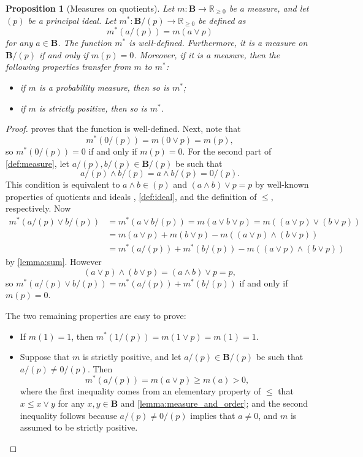 \documentclass{article}
\newtheorem{proposition}{Proposition}
\theoremstyle{definition}
\theoremstyle{remark}
\begin{document}
\begin{proposition}[Measures on quotients] \label{def:measures_on_quotients}
  Let $m\colon \mathbf{B} \to \mathbb{R}_{\ge 0}$ be a measure, and let $(p)$ be
  a principal ideal. Let $m^*\colon \mathbf{B}/(p) \to \mathbb{R}_{\ge 0}$ be
  defined as
  \[
    m^*(a/(p)) = m(a \lor p)
  \]
  for any $a \in \mathbf{B}$. The function $m^*$ is well-defined. Furthermore,
  it is a measure on $\mathbf{B}/(p)$ if and only if $m(p) = 0$. Moreover, if it
  is a measure, then the following properties transfer from $m$ to $m^*$:
  \begin{itemize}
  \item if $m$ is a \emph{probability measure}, then so is $m^*$;
  \item if $m$ is \emph{strictly positive}, then so is $m^*$.
  \end{itemize}
\end{proposition}
\begin{proof}
   proves that the function is well-defined. Next,
  note that
  \[
    m^*(0/(p)) = m(0 \lor p) = m(p),
  \]
  so $m^*(0/(p)) = 0$ if and only if $m(p) = 0$. For the second part of
  \cref{def:measure}, let $a/(p), b/(p) \in \mathbf{B}/(p)$ be such that
  \[
    a/(p) \land b/(p) = a \land b / (p) = 0 / (p).
  \]
  This condition is equivalent to $a \land b \in (p)$ and $(a \land b) \lor p =
  p$ by well-known properties of quotients and ideals
  \cite{givant2008introduction}, \cref{def:ideal}, and the definition of $\le$,
  respectively. Now
  \begin{align*}
    m^*(a/(p) \lor b/(p)) &= m^*(a \lor b / (p)) = m(a \lor b \lor p) = m((a \lor p) \lor (b \lor p)) \\
                          &= m(a \lor p) + m(b \lor p) - m((a \lor p) \land (b \lor p)) \\
                          &= m^*(a/(p)) + m^*(b/(p)) - m((a \lor p) \land (b \lor p))
  \end{align*}
  by \cref{lemma:sum}. However
  \[
    (a \lor p) \land (b \lor p) = (a \land b) \lor p = p,
  \]
  so $m^*(a/(p) \lor b/(p)) = m^*(a/(p)) + m^*(b/(p))$ if and only if $m(p) = 0$.

  The two remaining properties are easy to prove:
  \begin{itemize}
  \item If $m(1) = 1$, then $m^*(1/(p)) = m(1 \lor p) = m (1) = 1$.
  \item Suppose that $m$ is strictly positive, and let $a/(p) \in
    \mathbf{B}/(p)$ be such that $a/(p) \ne 0/(p)$. Then
    \[
      m^*(a/(p)) = m(a \lor p) \ge m(a) > 0,
    \]
    where the first inequality comes from an elementary property of $\le$ that
    $x \le x \lor y$ for any $x, y \in \mathbf{B}$ \cite{sikorski1969boolean}
    and \cref{lemma:measure_and_order}; and the second inequality follows
    because $a/(p) \ne 0/(p)$ implies that $a \ne 0$, and $m$ is assumed to be
    strictly positive.
  \end{itemize}
\end{proof}
\end{document}
